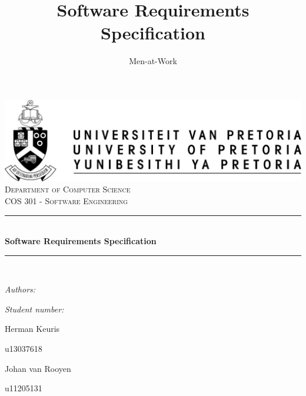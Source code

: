 \documentclass[hidelinks,a4paper,12pt]{article}
\author{Men-at-Work}
\title{ Software Requirements Specification}
\newcommand{\HRule}{\rule{\linewidth}{0.5mm}}
\begin{document}
\setlength{\parskip}{6pt}

\begin{titlepage}

\begin{center}
\includegraphics[width=1\textwidth]{./up-logo.jpg}\\[0.4cm]    
\textsc{\LARGE Department of Computer Science}\\[1.5cm]
\textsc{\Large COS 301 - Software Engineering}\\[0.5cm]
\HRule \\[0.4cm]
{ \huge \bfseries Software Requirements Specification}\\[0.4cm]
\HRule \\[0.4cm]
\begin{minipage}{0.4\textwidth}
\begin{flushleft} \large
\emph{Authors:}
\end{flushleft}
\end{minipage}
\begin{minipage}{0.4\textwidth}
\begin{flushright} \large
\emph{Student number:}
\end{flushright}
\end{minipage}

\begin{minipage}{0.4\textwidth}
\begin{flushleft} \large
Herman {Keuris}
\end{flushleft}
\end{minipage}
\begin{minipage}{0.4\textwidth}
\begin{flushright} \large
\emph{}
u13037618
\end{flushright}
\end{minipage}

\begin{minipage}{0.4\textwidth}
\begin{flushleft} \large
Johan {van Rooyen}
\end{flushleft}
\end{minipage}
\begin{minipage}{0.4\textwidth}
\begin{flushright} \large
\emph{}
u11205131
\end{flushright}
\end{minipage}


\end{center}
\end{titlepage}
\end{document}
